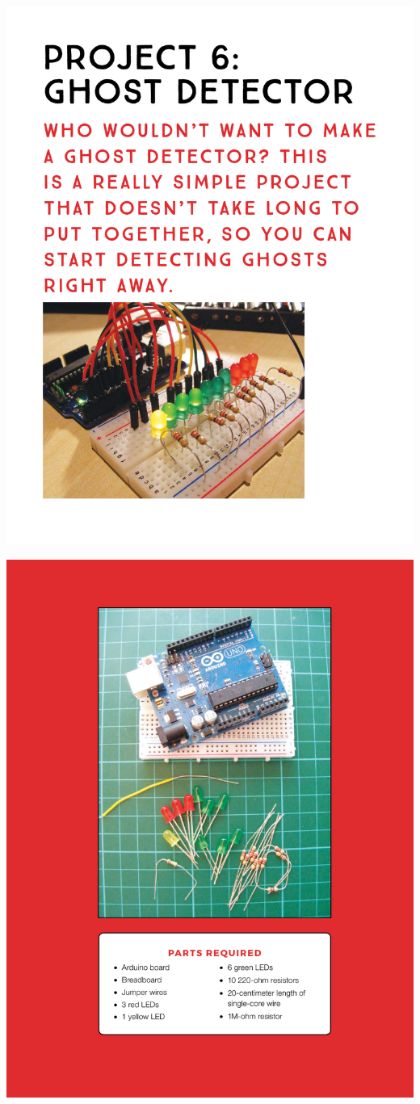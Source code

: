 \documentclass[11pt]{article}
\author{John Harwell}
\date{\today}
\title{}
\begin{document}
\begin{center}
\includegraphics[width=.9\linewidth]{./exp3-ghost-detector1.pdf}
\end{center}

\begin{center}
\includegraphics[width=.9\linewidth]{./exp3-ghost-detector2.pdf}
\end{center}
\end{document}
